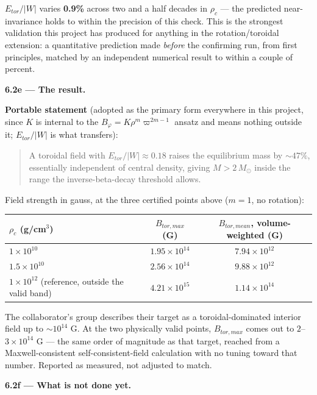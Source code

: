 \documentclass[11pt,a4paper]{scrartcl}
\begin{document}
$E_{tor}/|W|$ varies \textbf{0.9\%} across two and a half decades in
$\rho_c$ --- the predicted near-invariance holds to within the
precision of this check. This is the strongest validation this project
has produced for anything in the rotation/toroidal extension: a
quantitative prediction made \emph{before} the confirming run, from
first principles, matched by an independent numerical result to within
a couple of percent.

\medskip\noindent\textbf{6.2e --- The result.}

\textbf{Portable statement} (adopted as the primary form everywhere in
this project, since $K$ is internal to the $B_\varphi=K\rho^m
\varpi^{2m-1}$ ansatz and means nothing outside it; $E_{tor}/|W|$ is
what transfers):

\begin{quote}
A toroidal field with \textbf{$E_{tor}/|W|\approx0.18$} raises the
equilibrium mass by \textbf{$\sim47\%$}, essentially independent of
central density, giving $M>2\,M_\odot$ inside the range the
inverse-beta-decay threshold allows.
\end{quote}

Field strength in gauss, at the three certified points above ($m=1$,
no rotation):

\begin{center}
\begin{tabular}{@{}lcc@{}}
\toprule
$\rho_c$ (g/cm$^3$) & $B_{tor,max}$ (G) & $B_{tor,mean}$, volume-weighted (G)\\
\midrule
$1\times10^{10}$ & $1.95\times10^{14}$ & $7.94\times10^{12}$\\
$1.5\times10^{10}$ & $2.56\times10^{14}$ & $9.88\times10^{12}$\\
$1\times10^{12}$ (reference, outside the valid band) & $4.21\times10^{15}$ & $1.14\times10^{14}$\\
\bottomrule
\end{tabular}
\end{center}

The collaborator's group describes their target as a toroidal-dominated
interior field up to $\sim10^{14}$ G. At the two physically valid
points, $B_{tor,max}$ comes out to $2$--$3\times10^{14}$ G --- the same
order of magnitude as that target, reached from a Maxwell-consistent
self-consistent-field calculation with no tuning toward that number.
Reported as measured, not adjusted to match.

\medskip\noindent\textbf{6.2f --- What is not done yet.}
\end{document}
